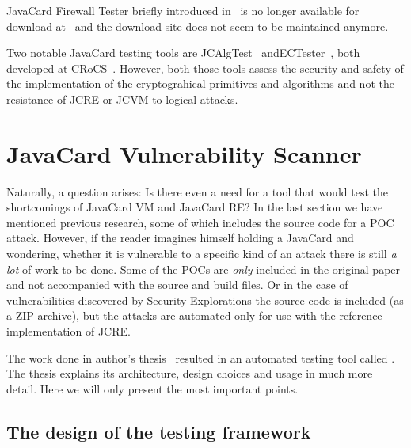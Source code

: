 \documentclass{../llncs/llncs}
\begin{document}

JavaCard Firewall Tester briefly introduced in~\cite{Mostowski07testingthe} is no longer available for download at~\cite{firewalltester} and the download site does not seem to be maintained anymore.

Two notable JavaCard testing tools are JCAlgTest~\cite{jcalgtest} and\linebreak ECTester~\cite{ectester}, both developed at CRoCS~\cite{crocsweb}. However, both those tools assess the security and safety of the implementation of the cryptograhical primitives and algorithms and not the resistance of JCRE or JCVM to logical attacks.

\section{JavaCard Vulnerability Scanner}\label{sec:javacard-vulnerability-scanner}
Naturally, a question arises: Is there even a need for a tool that would test the shortcomings of JavaCard VM and JavaCard RE?  In the last section we have mentioned previous research, some of which includes the source code for a POC attack. However, if the reader imagines himself holding a JavaCard and wondering, whether it is vulnerable to a specific kind of an attack there is still \textit{a lot} of work to be done. Some of the POCs are \textit{only} included in the original paper and not accompanied with the source and build files. Or in the case of vulnerabilities discovered by Security Explorations the source code is included (as a ZIP archive), but the attacks are automated only for use with the reference implementation of JCRE.

    The work done in author's thesis~\cite{Kvapil2020thesis} resulted in an automated testing tool called \projectname. The thesis explains its architecture, design choices and usage in much more detail. Here we will only present the most important points.
    
    \subsection{The design of the testing framework}
\end{document}
